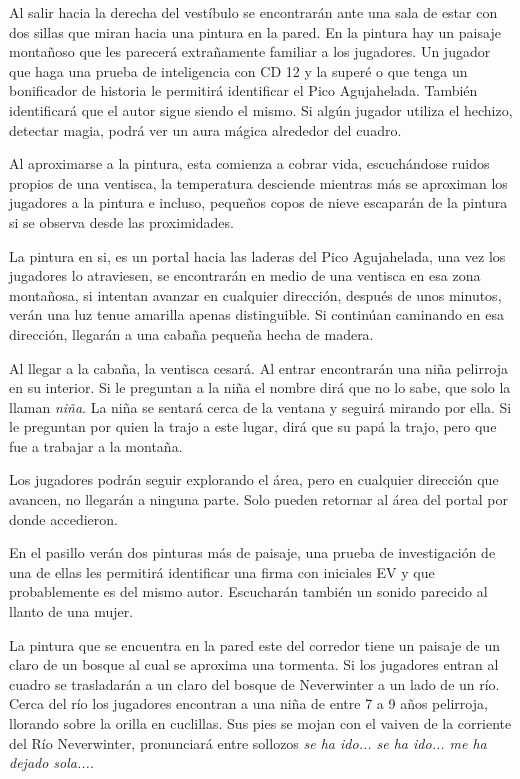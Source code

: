 \documentclass[10pt,twoside,twocolumn,openany]{dndbook}
\begin{document}

Al salir hacia la derecha del vestíbulo se encontrarán ante una sala de estar con dos sillas 
que miran hacia una pintura en la pared. En la pintura hay un paisaje montañoso que les parecerá
extrañamente familiar a los jugadores. Un jugador que haga una prueba de inteligencia con CD 12 
y la superé o que tenga un bonificador de historia le permitirá identificar el Pico Agujahelada.
También identificará que el autor sigue siendo el mismo. Si algún jugador utiliza el hechizo,
detectar magia, podrá ver un aura mágica alrededor del cuadro.

Al aproximarse a la pintura, esta comienza a cobrar vida, escuchándose ruidos propios de una 
ventisca, la temperatura desciende mientras más se aproximan los jugadores a la pintura e incluso,
pequeños copos de nieve escaparán de la pintura si se observa desde las proximidades.

La pintura en si, es un portal hacia las laderas del Pico Agujahelada, una vez los jugadores lo
atraviesen, se encontrarán en medio de una ventisca en esa zona montañosa, si intentan avanzar 
en cualquier dirección, después de unos minutos, verán una luz tenue amarilla apenas distinguible.
Si continúan caminando en esa dirección, llegarán a una cabaña pequeña hecha de madera. 

Al llegar a la cabaña, la ventisca cesará. Al entrar encontrarán una niña pelirroja en su interior.
Si le preguntan a la niña el nombre dirá que no lo sabe, que solo la llaman \emph{niña}. La niña
se sentará cerca de la ventana y seguirá mirando por ella. Si le preguntan por quien la
trajo a este lugar, dirá que su papá la trajo, pero que fue a trabajar a la montaña.

Los jugadores podrán seguir explorando el área, pero en cualquier dirección que avancen, no 
llegarán a ninguna parte. Solo pueden retornar al área del portal por donde accedieron.


En el pasillo verán dos pinturas más de paisaje, una prueba de investigación de una de ellas
les permitirá identificar una firma con iniciales EV y que probablemente es del mismo autor.
Escucharán también un sonido parecido al llanto de una mujer.

La pintura que se encuentra en la pared este del corredor tiene un paisaje de un claro de un 
bosque al cual se aproxima una tormenta. Si los jugadores entran al cuadro se trasladarán 
a un claro del bosque de Neverwinter a un lado de un río. Cerca del río los jugadores
encontran a una niña de entre 7 a 9 años pelirroja, llorando sobre la orilla en cuclillas.
Sus pies se mojan con el vaiven de la corriente del Río Neverwinter, pronunciará entre sollozos
\emph{se ha ido... se ha ido... me ha dejado sola...}.
\end{document}
